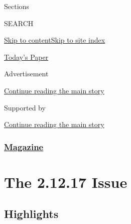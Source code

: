 Sections

SEARCH

\protect\hyperlink{site-content}{Skip to
content}\protect\hyperlink{site-index}{Skip to site index}

\href{https://myaccount.nytimes3xbfgragh.onion/auth/login?response_type=cookie\&client_id=vi}{}

\href{https://www.nytimes3xbfgragh.onion/section/todayspaper}{Today's
Paper}

Advertisement

\protect\hyperlink{after-top}{Continue reading the main story}

Supported by

\protect\hyperlink{after-sponsor}{Continue reading the main story}

\hypertarget{magazine}{%
\subsubsection{\texorpdfstring{\href{/section/magazine}{Magazine}}{Magazine}}\label{magazine}}

\hypertarget{the-21217-issue}{%
\section{The 2.12.17 Issue}\label{the-21217-issue}}

\hypertarget{highlights}{%
\subsection{Highlights}\label{highlights}}

